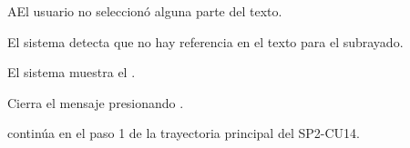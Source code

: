 \label{SP2-CU17-A}
\begin{UCtrayectoriaA}{A}{El usuario no seleccionó alguna parte del texto.}

	\UCpaso El sistema detecta que no hay referencia en el texto para el subrayado.

  \UCpaso El sistema muestra el .

  \UCpaso[\UCactor] Cierra el mensaje presionando .

  \UCpaso continúa en el paso 1 de la trayectoria principal del SP2-CU14.
\end{UCtrayectoriaA}
